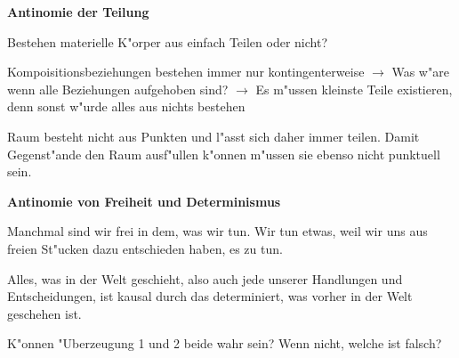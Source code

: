 \documentclass[emulatestandardclasses]{scrartcl}
\begin{document}
\textbf{Antinomie der Teilung}

\begin{description}[leftmargin=!,labelwidth=\widthof{\bfseries Contra-Argument}]
  \item[Frage] Bestehen materielle K"orper aus einfach Teilen oder nicht?
  \item[Pro-Argument] Kompoisitionsbeziehungen bestehen immer nur kontingenterweise $\rightarrow$ Was w"are wenn alle Beziehungen aufgehoben sind? $\rightarrow$ Es m"ussen kleinste Teile existieren, denn sonst w"urde alles aus nichts bestehen
  \item[Contra-Argument] Raum besteht nicht aus Punkten und l"asst sich daher immer teilen. Damit Gegenst"ande den Raum ausf"ullen k"onnen m"ussen sie ebenso nicht punktuell sein.
\end{description}
\vspace{9pt}
\noindent \textbf{Antinomie von Freiheit und Determinismus}

\begin{description}[leftmargin=!,labelwidth=\widthof{\bfseries "Uberzeugung 2}]
  \item["Uberzeugung 1] Manchmal sind wir frei in dem, was wir tun. Wir tun
etwas, weil wir uns aus freien St"ucken dazu entschieden haben, es zu tun.
  \item["Uberzeugung 2] Alles, was in der Welt geschieht, also auch jede unserer Handlungen und Entscheidungen, ist kausal durch das determiniert, was vorher in der Welt geschehen ist.
  \item[Frage] K"onnen "Uberzeugung 1 und 2 beide wahr sein? Wenn nicht, welche ist falsch?
\end{description}



\end{document}
